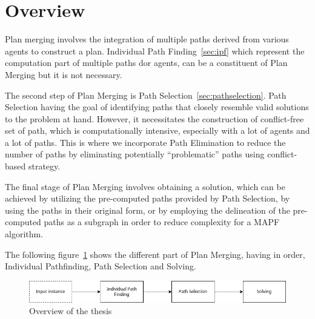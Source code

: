 \section{Overview}

Plan merging involves the integration of multiple paths derived from various agents to construct a plan. Individual Path Finding~\ref{sec:ipf} which represent the computation part of multiple paths dor agents, can be a constituent of Plan Merging but it is not necessary.

The second step of Plan Merging is Path Selection~\ref{sec:pathselection}. Path Selection having the goal of identifying paths that closely resemble valid solutions to the problem at hand. However, it necessitates the construction of conflict-free set of path, which is computationally intensive, especially with a lot of agents and a lot of paths. This is where we incorporate Path Elimination to reduce the number of paths by eliminating potentially ``problematic'' paths using conflict-based strategy.

The final stage of Plan Merging involves obtaining a solution, which can be achieved by utilizing the pre-computed paths provided by Path Selection, by using the paths in their original form, or by employing the delineation of the pre-computed paths as a subgraph in order to reduce complexity for a MAPF algorithm.


The following figure~\ref{fig:overview} shows the different part of Plan Merging, having in order, Individual Pathfinding, Path Selection and Solving.

\begin{figure}[H]
    \centering
    \caption{Overview of the thesis}\label{fig:overview}
    \includegraphics[width=\widthimg]{img/overview.drawio.png}
\end{figure}

